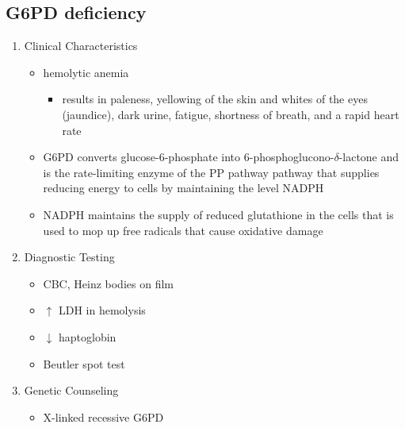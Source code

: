 \documentclass[12pt]{scrartcl}
\begin{document}
\subsection{G6PD deficiency}
\label{sec:orgafac90d}
\begin{enumerate}
\item Clinical Characteristics
\label{sec:org91ef676}
\begin{itemize}
\item hemolytic anemia
\begin{itemize}
\item results in paleness, yellowing of the skin and whites of the
eyes (jaundice), dark urine, fatigue, shortness of breath, and a
rapid heart rate
\end{itemize}
\item G6PD converts glucose-6-phosphate into
6-phosphoglucono-\(\delta\)-lactone and is the rate-limiting enzyme of
the PP pathway pathway that supplies reducing energy to cells by
maintaining the level NADPH
\item NADPH maintains the supply of reduced glutathione in the cells that
is used to mop up free radicals that cause oxidative damage
\end{itemize}
\item Diagnostic Testing
\label{sec:orgec7ed23}
\begin{itemize}
\item CBC, Heinz bodies on film
\item \(\uparrow\) LDH in hemolysis
\item \(\downarrow\) haptoglobin
\item Beutler spot test
\end{itemize}
\item Genetic Counseling
\label{sec:org61ea367}
\begin{itemize}
\item X-linked recessive G6PD
\end{itemize}
\end{enumerate}
\end{document}
